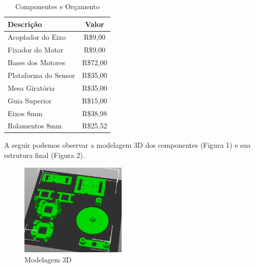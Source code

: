 \begin{table}[h]%
\caption{Componentes e Orçamento}%
\label{table:items}%
\begin{tabularx}{\textwidth}{@{\extracolsep{\fill}}lc}%
\toprule
Descrição & Valor \\
\midrule
Acoplador do Eixo           & R\$9,00 \\
Fixador do Motor            & R\$9,00 \\
Bases dos Motores          & R\$72,00 \\
Plataforma do Sensor        & R\$35,00 \\
Mesa Giratória              & R\$35,00 \\
Guia Superior               & R\$15,00  \\
Eixos 8mm                   & R\$38,98  \\
Rolamentos 8mm              & R\$25,52  \\
\bottomrule
\end{tabularx}
\end{table}

A seguir podemos observar a modelagem 3D dos componentes (Figura 1) e sua estrutura final (Figura 2).

\begin{figure}[H]
\captionsetup{width=0.6\textwidth}%
\caption{Modelagem 3D}%
\label{foto:eletronica_frontal}%
\includegraphics[width=0.45\textwidth]{3.Mecânica/Imagem/STL.jpeg}%
\end{figure}

